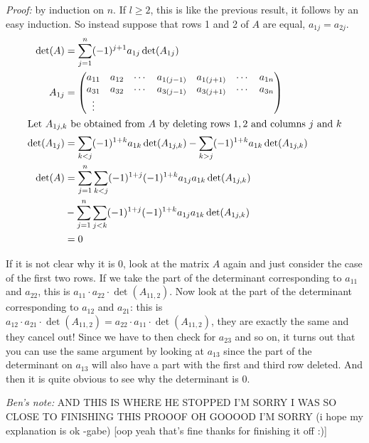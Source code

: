 \documentclass{report}
\theoremstyle{remark}
\theoremstyle{definition}
\theoremstyle{definition}
\theoremstyle{theorem}
\begin{document}
\emph{Proof:} by induction on $n$. If $l \geq 2$, this is like the previous result, it follows by an easy induction. So instead suppose that rows 1 and 2 of $A$ are equal, $a_{1j} = a_{2j}$.
\begin{align*}
    \det(A)&= \sum_{j=1}^n(-1)^{j+1}a_{1j}\det(A_{1j})\\
    A_{1j}&=\begin{pmatrix}
    a_{11}&a_{12}&\cdots&a_{1(j-1)}&a_{1(j+1)}&\cdots&a_{1n}\\
    a_{31}&a_{32}&\cdots&a_{3(j-1)}&a_{3(j+1)}&\cdots&a_{3n}\\
    \vdots&&&&&&
    \end{pmatrix}\\
    \intertext{Let $A_{1j,k}$ be obtained from $A$ by deleting rows $1,2$ and columns $j$ and $k$}
    \det(A_{1j}) &= \sum_{k<j}(-1)^{1+k}a_{1k}\det(A_{1j,k})-\sum_{k>j}(-1)^{1+k}a_{1k}\det(A_{1j,k})\\
    \det(A) &= \sum_{j=1}^n\sum_{k<j}(-1)^{1+j}(-1)^{1+k}a_{1j}a_{1k}\det(A_{1j,k})\\ &-\sum_{j=1}^n\sum_{j<k}(-1)^{1+j}(-1)^{1+k}a_{1j}a_{1k}\det(A_{1j,k})\\
    &= 0
\end{align*}

If it is not clear why it is 0, look at the matrix $A$ again and just consider the case of the first two rows. If we take the part of the determinant corresponding to $a_{11}$ and $a_{22}$, this is $a_{11}\cdot a_{22} \cdot \det(A_{11,2})$. Now look at the part of the determinant corresponding to $a_{12}$ and $a_{21}$: this is $a_{12}\cdot a_{21}\cdot \det(A_{11,2}) =a_{22}\cdot a_{11}\cdot \det(A_{11,2})$, they are exactly the same and they cancel out! Since we have to then check for $a_{23}$ and so on, it turns out that you can use the same argument by looking at $a_{13}$ since the part of the determinant on $a_{13}$ will also have a part with the first and third row deleted. And then it is quite obvious to see why the determinant is 0.

\emph{Ben's note:} AND THIS IS WHERE HE STOPPED I'M SORRY I WAS SO CLOSE TO FINISHING THIS PROOOF OH GOOOOD I'M SORRY (i hope my explanation is ok -gabe) [oop yeah that's fine thanks for finishing it off :)]\par
\end{document}
